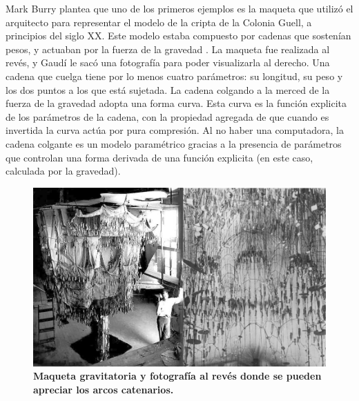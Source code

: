 Mark Burry plantea que uno de los primeros ejemplos es la maqueta que utilizó el arquitecto para representar el modelo de la cripta de la Colonia Guell, a principios del siglo XX. Este modelo estaba compuesto por cadenas que sostenían pesos, y actuaban por la fuerza de la gravedad \citep{Kaled2016}.
La maqueta fue realizada al revés, y Gaudí le sacó una fotografía para poder visualizarla al derecho. Una cadena que cuelga tiene por lo menos cuatro parámetros: su longitud, su peso y los dos puntos a los que está sujetada. La cadena colgando a la merced de la fuerza de la gravedad adopta una forma curva. Esta curva es la función explicita de los parámetros de la cadena, con la propiedad agregada de que cuando es invertida la curva actúa por pura compresión. Al no haber una computadora, la cadena colgante es un modelo paramétrico gracias a la presencia de parámetros que controlan una forma derivada de una función explicita (en este caso, calculada por la gravedad). 


\begin{figure}[h]
\includegraphics[width=12cm]{Img/GEO/geo-gaudic.jpg}
\centering
\caption{\textbf{\footnotesize{Maqueta gravitatoria y fotografía al revés donde se pueden apreciar los arcos catenarios.}}}
\label{fig:gaudi}
\end{figure}

